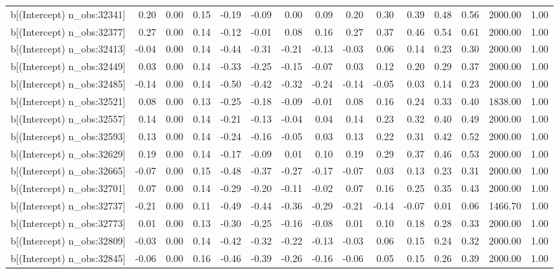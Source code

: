 \begin{table}[ht]
\begin{tabular}{rrrrrrrrrrrrrrr}
  b[(Intercept) n\_obs:32341] & 0.20 & 0.00 & 0.15 & -0.19 & -0.09 & 0.00 & 0.09 & 0.20 & 0.30 & 0.39 & 0.48 & 0.56 & 2000.00 & 1.00 \\ 
  b[(Intercept) n\_obs:32377] & 0.27 & 0.00 & 0.14 & -0.12 & -0.01 & 0.08 & 0.16 & 0.27 & 0.37 & 0.46 & 0.54 & 0.61 & 2000.00 & 1.00 \\ 
  b[(Intercept) n\_obs:32413] & -0.04 & 0.00 & 0.14 & -0.44 & -0.31 & -0.21 & -0.13 & -0.03 & 0.06 & 0.14 & 0.23 & 0.30 & 2000.00 & 1.00 \\ 
  b[(Intercept) n\_obs:32449] & 0.03 & 0.00 & 0.14 & -0.33 & -0.25 & -0.15 & -0.07 & 0.03 & 0.12 & 0.20 & 0.29 & 0.37 & 2000.00 & 1.00 \\ 
  b[(Intercept) n\_obs:32485] & -0.14 & 0.00 & 0.14 & -0.50 & -0.42 & -0.32 & -0.24 & -0.14 & -0.05 & 0.03 & 0.14 & 0.23 & 2000.00 & 1.00 \\ 
  b[(Intercept) n\_obs:32521] & 0.08 & 0.00 & 0.13 & -0.25 & -0.18 & -0.09 & -0.01 & 0.08 & 0.16 & 0.24 & 0.33 & 0.40 & 1838.00 & 1.00 \\ 
  b[(Intercept) n\_obs:32557] & 0.14 & 0.00 & 0.14 & -0.21 & -0.13 & -0.04 & 0.04 & 0.14 & 0.23 & 0.32 & 0.40 & 0.49 & 2000.00 & 1.00 \\ 
  b[(Intercept) n\_obs:32593] & 0.13 & 0.00 & 0.14 & -0.24 & -0.16 & -0.05 & 0.03 & 0.13 & 0.22 & 0.31 & 0.42 & 0.52 & 2000.00 & 1.00 \\ 
  b[(Intercept) n\_obs:32629] & 0.19 & 0.00 & 0.14 & -0.17 & -0.09 & 0.01 & 0.10 & 0.19 & 0.29 & 0.37 & 0.46 & 0.53 & 2000.00 & 1.00 \\ 
  b[(Intercept) n\_obs:32665] & -0.07 & 0.00 & 0.15 & -0.48 & -0.37 & -0.27 & -0.17 & -0.07 & 0.03 & 0.13 & 0.23 & 0.31 & 2000.00 & 1.00 \\ 
  b[(Intercept) n\_obs:32701] & 0.07 & 0.00 & 0.14 & -0.29 & -0.20 & -0.11 & -0.02 & 0.07 & 0.16 & 0.25 & 0.35 & 0.43 & 2000.00 & 1.00 \\ 
  b[(Intercept) n\_obs:32737] & -0.21 & 0.00 & 0.11 & -0.49 & -0.44 & -0.36 & -0.29 & -0.21 & -0.14 & -0.07 & 0.01 & 0.06 & 1466.70 & 1.00 \\ 
  b[(Intercept) n\_obs:32773] & 0.01 & 0.00 & 0.13 & -0.30 & -0.25 & -0.16 & -0.08 & 0.01 & 0.10 & 0.18 & 0.28 & 0.33 & 2000.00 & 1.00 \\ 
  b[(Intercept) n\_obs:32809] & -0.03 & 0.00 & 0.14 & -0.42 & -0.32 & -0.22 & -0.13 & -0.03 & 0.06 & 0.15 & 0.24 & 0.32 & 2000.00 & 1.00 \\ 
  b[(Intercept) n\_obs:32845] & -0.06 & 0.00 & 0.16 & -0.46 & -0.39 & -0.26 & -0.16 & -0.06 & 0.05 & 0.15 & 0.26 & 0.39 & 2000.00 & 1.00 \\ 

\end{tabular}
\end{table}
